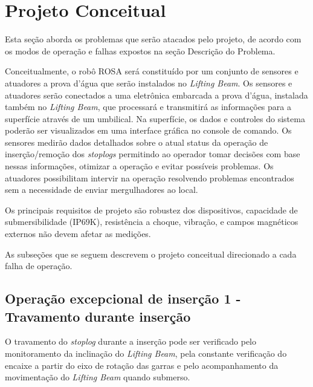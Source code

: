 

\section{Projeto Conceitual}
Esta seção aborda os problemas que serão atacados pelo projeto, de acordo com os
modos de operação e falhas expostos na seção Descrição do Problema.

Conceitualmente, o robô ROSA será constituído por um conjunto de sensores e
atuadores a prova d'água que serão instalados no \emph{Lifting Beam}. Os
sensores e atuadores serão conectados a uma eletrônica embarcada a prova d'água,
instalada também no \emph{Lifting Beam}, que processará e transmitirá as
informações para a superfície através de um umbilical. Na superfície, os dados e
controles do sistema poderão ser visualizados em uma interface gráfica no
console de comando. Os sensores medirão dados detalhados sobre o atual status da
operação de inserção/remoção dos \emph{stoplogs} permitindo ao operador tomar decisões
com base nessas informações, otimizar a operação e evitar possíveis problemas.
Os atuadores possibilitam intervir na operação resolvendo problemas encontrados
sem a necessidade de enviar mergulhadores ao local.

Os principais requisitos de projeto são robustez dos dispositivos, capacidade de
submersibilidade (IP69K), resistência a choque, vibração, e campos magnéticos
externos não devem afetar as medições.

As subseções que se seguem descrevem o projeto conceitual direcionado a cada
falha de operação.


\subsection{Operação excepcional de inserção 1 - Travamento durante inserção} O
travamento do \emph{stoplog} durante a inserção pode ser verificado pelo
monitoramento da inclinação do \emph{Lifting Beam}, pela constante verificação
do encaixe a partir do eixo de rotação das garras e pelo acompanhamento da
movimentação do \emph{Lifting Beam} quando submerso.

